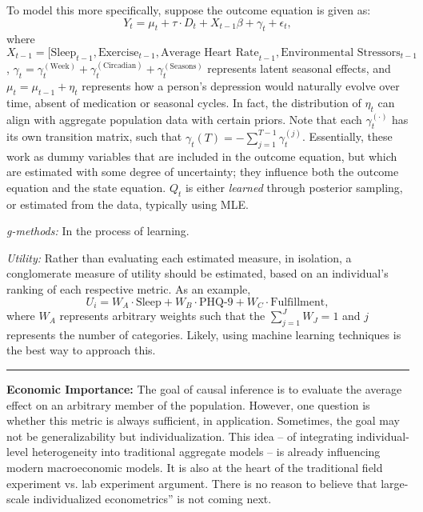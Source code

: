 \documentclass[12pt,letterpaper,doublespace, oneside]{article}
\begin{document}
To model this more specifically, suppose the outcome equation is given as: 
\[
Y_t = \mu_t + \tau \cdot D_t + X_{t-1}\beta + \gamma_t + \epsilon_t,
\]
where $X_{t-1} = [\text{Sleep}_{t-1}, \text{Exercise}_{t-1}, \text{Average Heart Rate}_{t-1}, \text{Environmental Stressors}_{t-1}$, $\gamma_t = \gamma_t^{(\text{Week})} + \gamma_t^{(\text{Circadian})} + \gamma_t^{(\text{Seasons})} $ represents latent seasonal effects, and $\mu_t = \mu_{t-1} + \eta_t$ represents how a person's depression would naturally evolve over time, absent of medication or seasonal cycles. In fact, the distribution of $\eta_t$ can align with aggregate population data with certain priors. Note that each $\gamma_t^{(\cdot)}$ has its own transition matrix, such that $\gamma_t(T) = -\sum_{j=1}^{T-1}\gamma_t^{(j)}$. Essentially, these work as dummy variables that are included in the outcome equation, but which are estimated with some degree of uncertainty; they influence both the outcome equation and the state equation. $Q_t$ is either  \emph{learned} through posterior sampling, or estimated from the data, typically using MLE. 

\bigskip

\emph{g-methods:} In the process of learning. 


\emph{Utility:} Rather than evaluating each estimated measure, in isolation, a conglomerate measure of utility should be estimated, based on an individual's ranking of each respective metric. As an example, 
\[
U_i = W_A \cdot \text{Sleep} + W_B \cdot \text{PHQ-9} + W_C \cdot \text{Fulfillment},
\]
where $W_A$ represents arbitrary weights such that the $\sum_{j = 1}^JW_J = 1$ and $j$ represents the number of categories. Likely, using machine learning techniques is the best way to approach this. 



\noindent


\noindent\rule{\linewidth}{0.4pt}

\noindent


\noindent\textbf{Economic Importance:} The goal of causal inference is to evaluate the average effect on an arbitrary member of the population. However, one question is whether this metric is always sufficient, in application. Sometimes, the goal may not be generalizability but individualization. This idea -- of integrating individual-level heterogeneity into traditional aggregate models -- is already influencing modern macroeconomic models. It is also at the heart of the traditional field experiment vs. lab experiment argument. There is no reason to believe that large-scale individualized econometrics'' is not coming next. 
\end{document}
